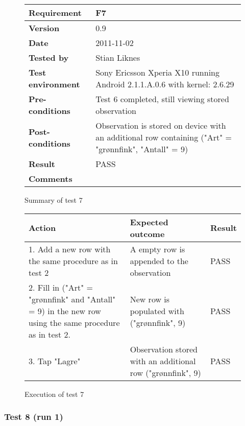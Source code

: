 	\begin{figure}[htb]
		\centering
		\begin{tabular}{|p{3.5cm}|p{7.0cm}|} \hline
			\textbf{Requirement} & F7 \\ \hline
			\textbf{Version} & 0.9 \\ \hline
			\textbf{Date} & 2011-11-02 \\ \hline
			\textbf{Tested by} & Stian Liknes \\ \hline
			\textbf{Test environment} & Sony Ericsson Xperia X10 running Android 2.1.1.A.0.6 with kernel: 2.6.29 \\ \hline
			\textbf{Pre-conditions} & Test 6 completed, still viewing stored observation \\ \hline
			\textbf{Post-conditions} & Observation is stored on device with an additional row containing ("Art" = "grønnfink", "Antall" = 9) \\ \hline
			\textbf{Result} & PASS \\ \hline
			\textbf{Comments} & \\ \hline
		\end{tabular}
		\caption{Summary of test 7}
	\end{figure}

	\begin{figure}[htb]
		\centering
		\begin{tabular}{|p{5.0cm}|p{5.0cm}|p{1cm}|}
			\hline \textbf{Action} & \textbf{Expected outcome} & \textbf{Result} \\ \hline

			1. Add a new row with the same procedure as in test 2 &
			A empty row is appended to the observation &
			PASS \\ \hline

			2. Fill in ("Art" = "grønnfink" and "Antall" = 9) in the new row
			using the same procedure as in test 2. &
			New row is populated with ("grønnfink", 9) &
			PASS \\ \hline

			3. Tap "Lagre" &
			Observation stored with an additional row ("grønnfink", 9) &
			PASS \\ \hline

		\end{tabular}
		\caption{Execution of test 7}
	\end{figure}

\newpage
\subsubsection{Test 8 (run 1)}

